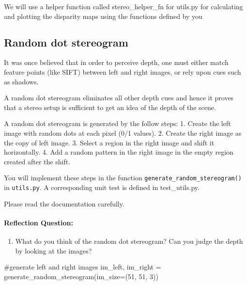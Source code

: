 \documentclass[
  letterpaper,
  DIV=11,
  numbers=noendperiod]{scrartcl}
\let\oldparagraph\paragraph
\renewcommand{\paragraph}[1]{\oldparagraph{#1}\mbox{}}
\newenvironment{Shaded}{\begin{snugshade}}{\end{snugshade}}
\newcommand{\CommentTok}[1]{\textcolor[rgb]{0.37,0.37,0.37}{#1}}
\newcommand{\DecValTok}[1]{\textcolor[rgb]{0.68,0.00,0.00}{#1}}
\newcommand{\NormalTok}[1]{\textcolor[rgb]{0.00,0.23,0.31}{#1}}
\newcommand{\OperatorTok}[1]{\textcolor[rgb]{0.37,0.37,0.37}{#1}}
\providecommand{\tightlist}{%
  \setlength{\itemsep}{0pt}\setlength{\parskip}{0pt}}\usepackage{longtable,booktabs,array}
\begin{document}
We will use a helper function called stereo\_helper\_fn for utils.py for
calculating and plotting the disparity maps using the functions defined
by you

\hypertarget{random-dot-stereogram}{%
\subsection{Random dot stereogram}\label{random-dot-stereogram}}

It was once believed that in order to perceive depth, one must either
match feature points (like SIFT) between left and right images, or rely
upon cues such as shadows.

A random dot stereogram eliminates all other depth cues and hence it
proves that a stereo setup is sufficient to get an idea of the depth of
the scene.

A random dot stereogram is generated by the follow steps: 1. Create the
left image with random dots at each pixel (0/1 values). 2. Create the
right image as the copy of left image. 3. Select a region in the right
image and shift it horizontally. 4. Add a random pattern in the right
image in the empty region created after the shift.

You will implement these steps in the function
\texttt{generate\_random\_stereogram()} in \texttt{utils.py}. A
corresponding unit test is defined in test\_utils.py.

Please read the documentation carefully.

\hypertarget{reflection-question}{%
\paragraph{Reflection Question:}\label{reflection-question}}

\begin{enumerate}
\def\labelenumi{\arabic{enumi}.}
\tightlist
\item
  What do you think of the random dot stereogram? Can you judge the
  depth by looking at the images?
\end{enumerate}

\begin{Shaded}
\begin{Highlighting}[]
\CommentTok{\#generate left and right images}
\NormalTok{im\_left, im\_right }\OperatorTok{=}\NormalTok{ generate\_random\_stereogram(im\_size}\OperatorTok{=}\NormalTok{(}\DecValTok{51}\NormalTok{, }\DecValTok{51}\NormalTok{, }\DecValTok{3}\NormalTok{))}
\end{Highlighting}
\end{Shaded}
\end{document}
